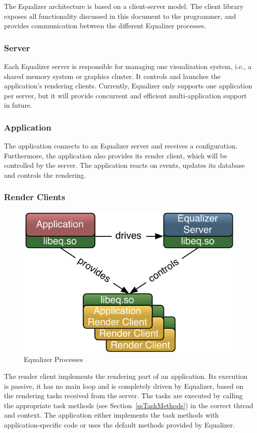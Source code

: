 \documentclass[10pt,a4]{scrartcl}
\newcommand{\sref}[1]{Section~\ref{#1}}
\begin{document}
The Equalizer architecture is based on a client-server model. The client
library exposes all functionality discussed in this document to the
programmer, and provides communication between the different Equalizer
processes.

\subsubsection{Server}
Each Equalizer server is responsible for managing one visualization
system, i.e., a shared memory system or graphics cluster.  It controls
and launches the application's rendering clients.  Currently, Equalizer
only supports one application per server, but it will provide
concurrent and efficient multi-application support in future.

\subsubsection{Application}

The application connects to an Equalizer server and receives a
configuration.  Furthermore, the application also provides its render
client, which will be controlled by the server. The application reacts
on events, updates its database and controls the rendering.

\subsubsection{Render Clients}

\begin{figure}
  \includegraphics[width=.382\textwidth]{images/processes.pdf}
  {\caption{\small\label{fProcesses}Equalizer Processes}}
\end{figure}
The render client implements the rendering part of an application. Its
execution is passive, it has no main loop and is completely driven by
Equalizer, based on the rendering tasks received from the server. The
tasks are executed by calling the appropriate task methods (see
\sref{ssTaskMethods}) in the correct thread and context. The application
either implements the task methods with application-specific code or
uses the default methods provided by Equalizer.
\end{document}
